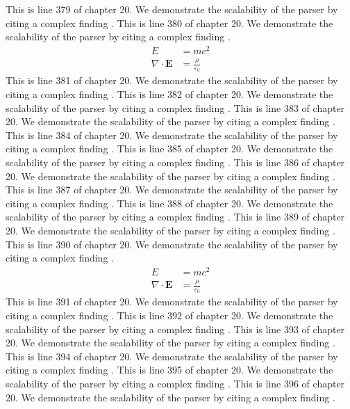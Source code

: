 This is line 379 of chapter 20. We demonstrate the scalability of the parser by citing a complex finding \cite{ref20_379}.
This is line 380 of chapter 20. We demonstrate the scalability of the parser by citing a complex finding \cite{ref20_380}.
\begin{align*}
  E &= mc^2 \\
  \nabla \cdot \mathbf{E} &= \frac{\rho}{\varepsilon_0}
\end{align*}
This is line 381 of chapter 20. We demonstrate the scalability of the parser by citing a complex finding \cite{ref20_381}.
This is line 382 of chapter 20. We demonstrate the scalability of the parser by citing a complex finding \cite{ref20_382}.
This is line 383 of chapter 20. We demonstrate the scalability of the parser by citing a complex finding \cite{ref20_383}.
This is line 384 of chapter 20. We demonstrate the scalability of the parser by citing a complex finding \cite{ref20_384}.
This is line 385 of chapter 20. We demonstrate the scalability of the parser by citing a complex finding \cite{ref20_385}.
This is line 386 of chapter 20. We demonstrate the scalability of the parser by citing a complex finding \cite{ref20_386}.
This is line 387 of chapter 20. We demonstrate the scalability of the parser by citing a complex finding \cite{ref20_387}.
This is line 388 of chapter 20. We demonstrate the scalability of the parser by citing a complex finding \cite{ref20_388}.
This is line 389 of chapter 20. We demonstrate the scalability of the parser by citing a complex finding \cite{ref20_389}.
This is line 390 of chapter 20. We demonstrate the scalability of the parser by citing a complex finding \cite{ref20_390}.
\begin{align*}
  E &= mc^2 \\
  \nabla \cdot \mathbf{E} &= \frac{\rho}{\varepsilon_0}
\end{align*}
This is line 391 of chapter 20. We demonstrate the scalability of the parser by citing a complex finding \cite{ref20_391}.
This is line 392 of chapter 20. We demonstrate the scalability of the parser by citing a complex finding \cite{ref20_392}.
This is line 393 of chapter 20. We demonstrate the scalability of the parser by citing a complex finding \cite{ref20_393}.
This is line 394 of chapter 20. We demonstrate the scalability of the parser by citing a complex finding \cite{ref20_394}.
This is line 395 of chapter 20. We demonstrate the scalability of the parser by citing a complex finding \cite{ref20_395}.
This is line 396 of chapter 20. We demonstrate the scalability of the parser by citing a complex finding \cite{ref20_396}.
